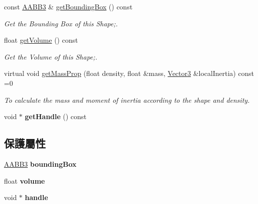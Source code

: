 \begin{DoxyCompactItemize}
const \hyperlink{class_magnum_1_1_a_a_b_b3}{A\+A\+B\+B3} \& \hyperlink{class_magnum_1_1_shape3_a5704ab3fe88257e1f842720fe87cd201}{get\+Bounding\+Box} () const 
\begin{DoxyCompactList}\small\item\em Get the Bounding Box of this Shape;. \end{DoxyCompactList}\item 
float \hyperlink{class_magnum_1_1_shape3_a9b746b36c7cac8ee9d0a14af666d4800}{get\+Volume} () const 
\begin{DoxyCompactList}\small\item\em Get the Volume of this Shape;. \end{DoxyCompactList}\item 
virtual void \hyperlink{class_magnum_1_1_shape3_a5d586c69e4a4b59b8386c3fbb8568984}{get\+Mass\+Prop} (float density, float \&mass, \hyperlink{class_magnum_1_1_vector3}{Vector3} \&local\+Inertia) const  =0
\begin{DoxyCompactList}\small\item\em To calculate the mass and moment of inertia according to the shape and density. \end{DoxyCompactList}\item 
void $\ast$ {\bfseries get\+Handle} () const \hypertarget{class_magnum_1_1_shape3_a9832dc3490b5a022d49f2011373ba2af}{}\label{class_magnum_1_1_shape3_a9832dc3490b5a022d49f2011373ba2af}

\end{DoxyCompactItemize}
\subsection*{保護屬性}
\begin{DoxyCompactItemize}
\item 
\hyperlink{class_magnum_1_1_a_a_b_b3}{A\+A\+B\+B3} {\bfseries bounding\+Box}\hypertarget{class_magnum_1_1_shape3_a66cacb9581eb84c3743fb9f6dcf37068}{}\label{class_magnum_1_1_shape3_a66cacb9581eb84c3743fb9f6dcf37068}

\item 
float {\bfseries volume}\hypertarget{class_magnum_1_1_shape3_a654d0ce378a068968b555ce54a6b4a91}{}\label{class_magnum_1_1_shape3_a654d0ce378a068968b555ce54a6b4a91}

\item 
void $\ast$ {\bfseries handle}\hypertarget{class_magnum_1_1_shape3_ab0b494d02e050f5d8a55bf3aafd52e94}{}\label{class_magnum_1_1_shape3_ab0b494d02e050f5d8a55bf3aafd52e94}

\end{DoxyCompactItemize}


